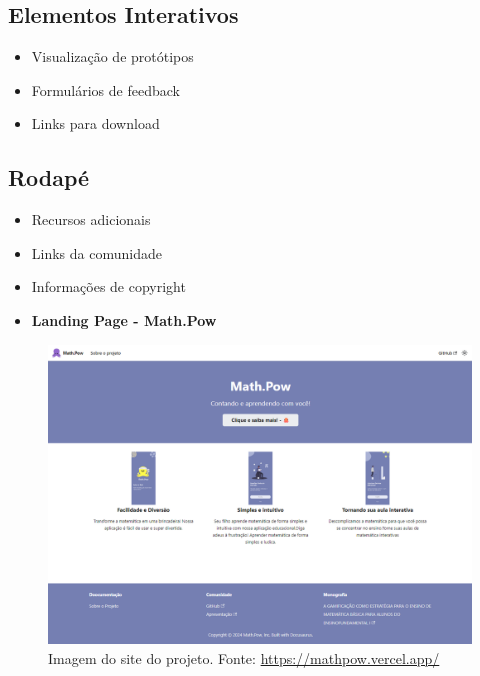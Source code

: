 \subsection{Elementos Interativos}
\begin{itemize}
    \item Visualização de protótipos
    \item Formulários de feedback
    \item Links para download
\end{itemize}

\subsection{Rodapé}
\begin{itemize}
    \item Recursos adicionais
    \item Links da comunidade
    \item Informações de copyright
\end{itemize}

\begin{itemize}
    \item \textbf{Landing Page - Math.Pow}
\end{itemize}

\begin{figure}[h!]
    \centering
    \includegraphics[width=0.8\linewidth]{figuras/Math.Pow App/mathPow.png}
    \caption{Imagem do site do projeto. Fonte: \url{https://mathpow.vercel.app/}}
    \label{fig:Figma}
\end{figure}

 
